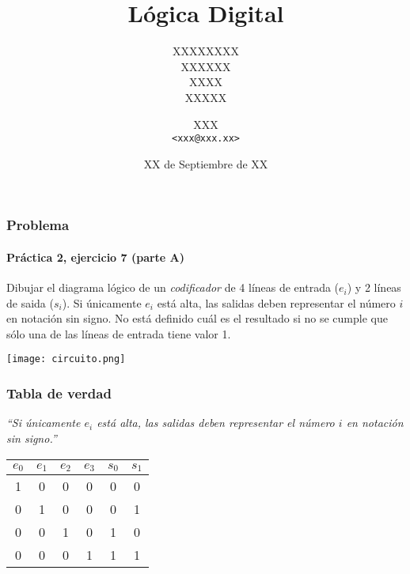 \documentclass[spanish]{beamer}
\title{Lógica Digital}
\subtitle{
  XXXXXXXX \\
  \vspace{2em}
  XXXXXX \\
  XXXX \\
  XXXXX
}
\author{XXX \\ \footnotesize{\texttt{<xxx@xxx.xx>}}}
\date{XX de Septiembre de XX}
\institute{
  Departamento de Computación \\
  Facultad de Ciencias Exactas y Naturales \\
  Universidad de Buenos Aires
}
\begin{document}
\begin{frame}
  \titlepage
\end{frame}

\begin{frame}
  \frametitle{Problema}
  \framesubtitle{Práctica 2, ejercicio 7 (parte A)}

  Dibujar el diagrama lógico de un \textit{codificador} de 4 líneas de
  entrada ($e_i$) y 2 líneas de saida ($s_i$). Si únicamente $e_i$ está alta,
  las salidas deben representar el número $i$ en notación sin signo. No está
  definido cuál es el resultado si no se cumple que sólo una de las líneas de
  entrada tiene valor 1.

  \begin{center}
    \vspace{1em}
    \texttt{[image: circuito.png]}
  \end{center}
\end{frame}

\begin{frame}
  \frametitle{Tabla de verdad}

  \textit{``Si únicamente $e_i$ está alta, las salidas deben representar el
  número $i$ en notación sin signo.''}

  \pause

  \begin{center}
    \begin{tabular}{c|c|c|c||c|c}
      $e_0$ & $e_1$ & $e_2$ & $e_3$ & $s_0$ & $s_1$ \\
      \hline
      1 & 0 & 0 & 0 & 0 & 0 \\
      0 & 1 & 0 & 0 & 0 & 1 \\
      0 & 0 & 1 & 0 & 1 & 0 \\
      0 & 0 & 0 & 1 & 1 & 1 \\
    \end{tabular}
  \end{center}
\end{frame}
\end{document}
